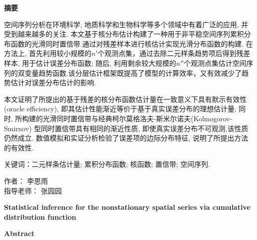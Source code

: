 \newpage %
\thispagestyle{fancy} %
\begin{center}
  {\Large \bf 摘要}
  
\end{center}

空间序列分析在环境科学, 地质科学和生物科学等多个领域中有着广泛的应用, 并受到越来越多的关注. 本文基于核分布估计构建了一种用于非平稳空间序列累积分布函数的光滑同时置信带.通过对残差样本进行核估计实现光滑分布函数的构建. 在方法上, 首先利用较小规模的$n'$个观测点集，通过去除二元样条趋势项后得到残差样本, 用于估计误差分布函数; 随后, 利用剩余较大规模的$n''$个观测点集估计空间序列的双变量趋势函数.该分层估计框架既提高了模型的计算效率，又有效减少了趋势估计对误差分布估计的影响.

本文证明了所提出的基于残差的核分布函数估计量在一致意义下具有默示有效性(oracle efficiency), 即其估计性能渐近等价于基于真实误差分布的理想估计量. 同时, 所构建的光滑同时置信带与经典柯尔莫格洛夫-斯米尔诺夫(Kolmogorov-Smirnov) 型同时置信带具有相同的渐近性质, 即使真实误差分布不可观测,该性质仍然成立.
数值模拟和实证分析检验了误差项的边际分布特征, 说明了所提出方法的有效性.


{\Large 关键词：}二元样条估计量; 累积分布函数; 核函数; 置信带; 空间序列.
\begin{flushright}
  作者： 李思雨\\
指导老师： 张园园
\end{flushright}

\newpage %
\thispagestyle{fancy}
\begin{center}
  {\Large \bf  Statistical inference for the nonstationary spatial series via cumulative distribution function }
\end{center}


\begin{center}

  { \bf  Abstract }
\end{center}


